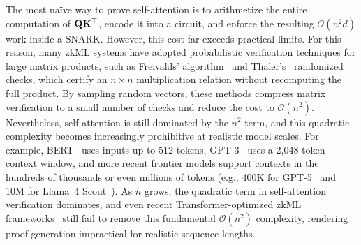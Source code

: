 \documentclass[letterpaper,twocolumn,10pt]{article}
\begin{document}
The most na\"ive way to prove self-attention is to arithmetize the entire computation of ${\mathbf{Q}}{\mathbf{K}}^\top$, encode it into a circuit, and enforce the resulting $\mathcal{O}(n^2 d)$ work inside a SNARK. However, this cost far exceeds practical limits. For this reason, many zkML systems have adopted probabilistic verification techniques for large matrix products, such as Freivalds' algorithm~\cite{Freivalds} and Thaler's~\cite{Thaler} randomized checks, which certify an $n\times n$ multiplication relation without recomputing the full product. By sampling random vectors, these methods compress matrix verification to a small number of checks and reduce the cost to $\mathcal{O}(n^2)$. Nevertheless, self-attention is still dominated by the $n^2$ term, and this quadratic complexity becomes increasingly prohibitive at realistic model scales. For example, BERT~\cite{BERT} uses inputs up to 512 tokens, GPT-3~\cite{GPT3} uses a 2{,}048-token context window, and more recent frontier models support contexts in the hundreds of thousands or even millions of tokens (e.g., 400K for GPT-5~\cite{GPT5} and 10M for Llama~4 Scout~\cite{llama4}). As $n$ grows, the quadratic term in self-attention verification dominates, and even recent Transformer-optimized zkML frameworks~\cite{A} still fail to remove this fundamental $\mathcal{O}(n^2)$ complexity, rendering proof generation impractical for realistic sequence lengths.
\end{document}
